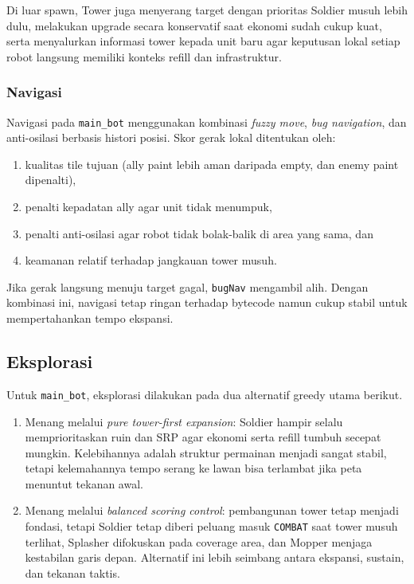Di luar spawn, Tower juga menyerang target dengan prioritas Soldier musuh lebih dulu, melakukan upgrade secara konservatif saat ekonomi sudah cukup kuat, serta menyalurkan informasi tower kepada unit baru agar keputusan lokal setiap robot langsung memiliki konteks refill dan infrastruktur.

\subsubsection{Navigasi}

Navigasi pada \texttt{main\_bot} menggunakan kombinasi \textit{fuzzy move}, \textit{bug navigation}, dan anti-osilasi berbasis histori posisi. Skor gerak lokal ditentukan oleh:
\begin{enumerate}
    \item kualitas tile tujuan (ally paint lebih aman daripada empty, dan enemy paint dipenalti),
    \item penalti kepadatan ally agar unit tidak menumpuk,
    \item penalti anti-osilasi agar robot tidak bolak-balik di area yang sama, dan
    \item keamanan relatif terhadap jangkauan tower musuh.
\end{enumerate}

Jika gerak langsung menuju target gagal, \texttt{bugNav} mengambil alih. Dengan kombinasi ini, navigasi tetap ringan terhadap bytecode namun cukup stabil untuk mempertahankan tempo ekspansi.

\subsection{Eksplorasi}

Untuk \texttt{main\_bot}, eksplorasi dilakukan pada dua alternatif greedy utama berikut.
\begin{enumerate}
    \item Menang melalui \textit{pure tower-first expansion}: Soldier hampir selalu memprioritaskan ruin dan SRP agar ekonomi serta refill tumbuh secepat mungkin. Kelebihannya adalah struktur permainan menjadi sangat stabil, tetapi kelemahannya tempo serang ke lawan bisa terlambat jika peta menuntut tekanan awal.
    \item Menang melalui \textit{balanced scoring control}: pembangunan tower tetap menjadi fondasi, tetapi Soldier tetap diberi peluang masuk \texttt{COMBAT} saat tower musuh terlihat, Splasher difokuskan pada coverage area, dan Mopper menjaga kestabilan garis depan. Alternatif ini lebih seimbang antara ekspansi, sustain, dan tekanan taktis.
\end{enumerate}

